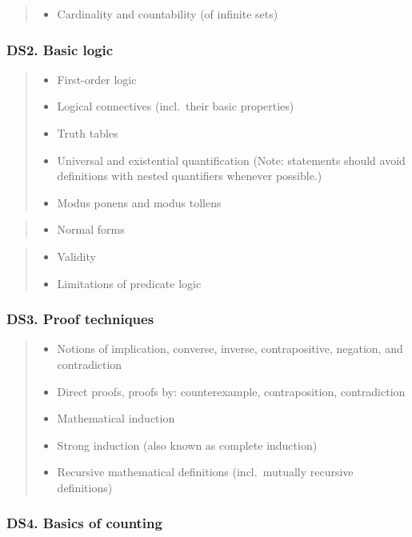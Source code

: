 \documentclass[a4paper,11pt,oneside]{article}
\newcommand{\cmark}{\ding{51}}%
\newcommand{\xmark}{\ding{55}}%
\newcommand{\CC}[1]{#1}
\newcommand{\cincl}{{\small\cmark}}
\newcommand{\cdef}{{\small\cmark\faFileTextO}}
\newcommand{\ccode}{{\small\cmark\faFileText}}
\newcommand{\cnfoc}{{\small\faQuestion}}
\newcommand{\cexcl}{{\small\xmark}}
\newcommand{\Iincluded}{\item[\hbox to 1.8em{\cincl\hfill}]}
\newcommand{\Idefine}{\item[\hbox to 1.8em{\cdef\hfill}]}
\newcommand{\Icodeonly}{\item[\hbox to 1.8em{\ccode\hfill}]}
\newcommand{\Inofocus}{\item[\hbox to 1.8em{\cnfoc\hfill}]}
\newcommand{\Iexcluded}{\item[\hbox to 1.8em{\cexcl\hfill}]}
\newenvironment{myitemize}{\begin{quote}\begin{itemize}\itemsep 0pt}{\end{itemize}\end{quote}}
\begin{document}
        \begin{myitemize}
        \Iexcluded{Cardinality and countability} (of infinite sets)
        \end{myitemize}
  
    \subsubsection*{DS2. Basic logic}

        \begin{myitemize}
        \Iincluded First-order logic
        \Iincluded\CC{Logical connectives} (incl.\ their basic properties)
        \Iincluded\CC{Truth tables}
        \Iincluded\CC{Universal and existential quantification} (Note: statements should avoid definitions with nested quantifiers whenever possible.)
        \Icodeonly\CC{Modus ponens and modus tollens}
        \end{myitemize}

        \begin{myitemize}
        \Inofocus \CC{Normal forms}
        \end{myitemize}
        
        \begin{myitemize}
        \Iexcluded \CC{Validity}
        \Iexcluded \CC{Limitations of predicate logic}
        \end{myitemize}

    \subsubsection*{DS3. Proof techniques}

        \begin{myitemize}
        \Idefine\CC{Notions of implication, converse, inverse, contrapositive, negation, and contradiction}
        \Icodeonly\CC{Direct proofs, proofs by: counterexample, contraposition, contradiction}
        \Icodeonly\CC{Mathematical induction}
        \Icodeonly\CC{Strong induction} (also known as complete induction)
        \Iincluded\CC{Recursive mathematical definitions} (incl.\ mutually recursive definitions)
        \end{myitemize}

    \subsubsection*{DS4. Basics of counting}
\end{document}
